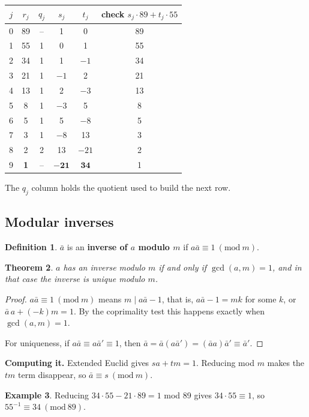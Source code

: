 \documentclass[11pt,a4paper]{article}
\newtheorem{theorem}{Theorem}[section]
\theoremstyle{definition}
\newtheorem{definition}[theorem]{Definition}
\newtheorem{example}[theorem]{Example}
\newcommand{\md}[1]{\ (\mathrm{mod}\ #1)}
\theoremstyle{noteit}
\theoremstyle{note}
\begin{document}
\begin{center}
\begin{tabular}{cccccc}
\toprule
$j$ & $r_j$ & $q_j$ & $s_j$ & $t_j$ & check $s_j\cdot89+t_j\cdot55$\\
\midrule
0 & 89 & -- & 1 & 0 & 89\\
1 & 55 & 1 & 0 & 1 & 55\\
2 & 34 & 1 & 1 & $-1$ & 34\\
3 & 21 & 1 & $-1$ & 2 & 21\\
4 & 13 & 1 & 2 & $-3$ & 13\\
5 & 8 & 1 & $-3$ & 5 & 8\\
6 & 5 & 1 & 5 & $-8$ & 5\\
7 & 3 & 1 & $-8$ & 13 & 3\\
8 & 2 & 2 & 13 & $-21$ & 2\\
9 & \textbf{1} & -- & $\mathbf{-21}$ & $\mathbf{34}$ & 1\\
\bottomrule
\end{tabular}
\end{center}
The $q_j$ column holds the quotient used to build the next row.

\subsection{Modular inverses}

\begin{definition}
$\bar a$ is an \textbf{inverse of $a$ modulo $m$} if $a\bar a\equiv 1\md m$.
\end{definition}

\begin{theorem}
$a$ has an inverse modulo $m$ if and only if $\gcd(a,m)=1$, and in that case the inverse is unique modulo $m$.
\end{theorem}
\begin{proof}
$a\bar a\equiv1\md m$ means $m\mid a\bar a-1$, that is, $a\bar a-1=mk$ for some $k$, or $\bar a\, a+(-k)m=1$. By the coprimality test this happens exactly when $\gcd(a,m)=1$.

For uniqueness, if $a\bar a\equiv a\bar a'\equiv1$, then $\bar a=\bar a(a\bar a')=(\bar a a)\bar a'\equiv\bar a'$.
\end{proof}

\textbf{Computing it.} Extended Euclid gives $sa+tm=1$. Reducing mod $m$ makes the $tm$ term disappear, so $\bar a\equiv s\md m$.

\begin{example}
Reducing $34\cdot55-21\cdot89=1$ mod 89 gives $34\cdot55\equiv1$, so $55^{-1}\equiv34\md{89}$.
\end{example}
\end{document}
